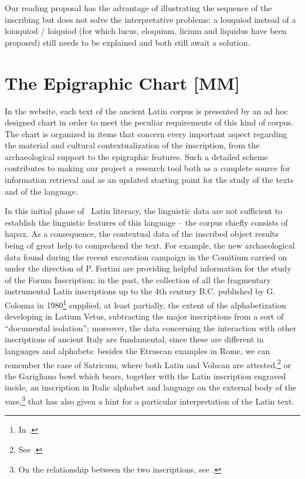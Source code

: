 \documentclass[amsthm,ebook]{saparticle}
\begin{document}
Our reading proposal has the advantage of illustrating the sequence of the inscribing but does not solve the
interpretative problems: a louquiod instead of a loiuquiod / loiquiod (for which lucus, eloquium, licium and liquidus
have been proposed) still needs to be explained and both still await a solution. 

\section{The Epigraphic Chart [MM]}\label{sec:3chart}


\noindent In the website, each text of the ancient Latin corpus is presented by an ad hoc designed chart in order to meet the
peculiar requirements of this kind of corpus. The chart is organized in items that concern every important aspect
regarding the material and cultural contextualization of the inscription, from the archaeological support to the
epigraphic features. Such a detailed scheme contributes to making our project a research tool both as a complete source
for information retrieval and as an updated starting point for the study of the texts and of the language.

In this initial phase of \ Latin literacy, the linguistic data are not sufficient to establish the linguistic features
of this language – the corpus chiefly consists of hapax. As a consequence, the contextual data of the inscribed object
results being of great help to comprehend the text. For example, the new archaeological data found during the recent
excavation campaign in the Comitium carried on under the direction of P. Fortini are providing helpful information for
the study of the Forum Inscription; in the past, the collection of all the fragmentary instrumental Latin inscriptions
up to the 4th century B.C. published by G. Colonna in 1980\footnote{In \citet{stibbe_lapis_1980}.} supplied, at least
partially, the extent of the alphabetization developing in Latium Vetus, subtracting the major inscriptions from a sort
of “documental isolation”; moreover, the data concerning the interaction with other inscriptions of ancient Italy are
fundamental, since these are different in languages and alphabets: besides the Etruscan examples in Rome, we can
remember the case of Satricum, where both Latin and Volscan are attested,\footnote{See \citet[189-198]{rocca_i_1995}.} or the
Garigliano bowl which bears, together with the Latin inscription engraved inside, an inscription in Italic alphabet and
language on the external body of the vase,\footnote{On the relationship between the two inscriptions, see \citet{antonini_osservazioni_2012}.} that has also given a hint for a particular interpretation of the Latin text. 
\end{document}
